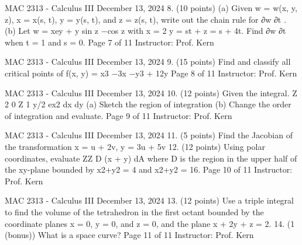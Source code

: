 MAC 2313 - Calculus III
December 13, 2024
8.
(10 points)
(a) Given w = w(x, y, z), x = x(s, t), y = y(s, t), and z = z(s, t), write out the chain rule for
∂w
∂t .
(b) Let w = xey + y sin z −cos z with x = 2
 y = st +  z = s + 4t. Find ∂w
∂t when t = 1
and s = 0.
Page 7 of 11
Instructor: Prof. Kern

MAC 2313 - Calculus III
December 13, 2024
9.
(15 points)
Find and classify all critical points of
f(x, y) = x3 −3x −y3 + 12y
Page 8 of 11
Instructor: Prof. Kern

MAC 2313 - Calculus III
December 13, 2024
10.
(12 points)
Given the integral.
Z 2
0
Z 1
y/2
ex2 dx dy
(a) Sketch the region of integration
(b) Change the order of integration and evaluate.
Page 9 of 11
Instructor: Prof. Kern

MAC 2313 - Calculus III
December 13, 2024
11.
(5 points)
Find the Jacobian of the transformation x = u + 2v, y = 3u + 5v
12.
(12 points)
Using polar coordinates, evaluate
ZZ
D
(x + y) dA
where D is the region in the upper half of the xy-plane bounded by x2+y2 = 4 and x2+y2 = 16.
Page 10 of 11
Instructor: Prof. Kern

MAC 2313 - Calculus III
December 13, 2024
13.
(12 points)
Use a triple integral to find the volume of the tetrahedron in the first octant bounded by the
coordinate planes x = 0, y = 0, and z = 0, and the plane x + 2y + z = 2.
14.
(1 (bonus))
What is a space curve?
Page 11 of 11
Instructor: Prof. Kern


